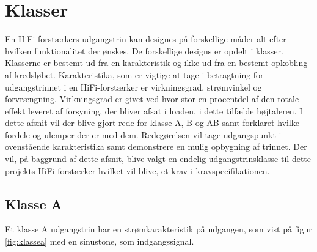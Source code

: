 \section{Klasser}
\label{klasser}
En HiFi-forstærkers udgangstrin kan designes på forskellige måder alt efter hvilken funktionalitet der ønskes. De forskellige designs er opdelt i klasser. Klasserne er bestemt ud fra en karakteristik og ikke ud fra en bestemt opkobling af kredsløbet. Karakteristika, som er vigtige at tage i betragtning for udgangstrinnet i en HiFi-forstærker er virkningsgrad, strømvinkel og forvrængning. Virkningsgrad er givet ved hvor stor en procentdel af den totale effekt leveret af forsyning, der bliver afsat i loaden, i dette tilfælde højtaleren.
I dette afsnit vil der blive gjort rede for klasse A, B og AB samt forklaret hvilke fordele og ulemper der er med dem. Redegørelsen vil tage udgangspunkt i ovenstående karakteristika samt demonstrere en mulig opbygning af trinnet.
Der vil, på baggrund af dette afsnit, blive valgt en endelig udgangstrinsklasse til dette projekts HiFi-forstærker hvilket vil blive, et krav i kravspecifikationen.

\subsection{Klasse A}

Et klasse A udgangstrin har en strømkarakteristik på udgangen, som vist på figur \ref{fig:klassea} med en sinustone, som indgangssignal. 

